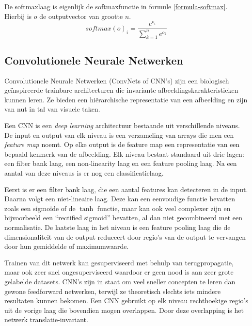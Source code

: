 De softmaxlaag is eigenlijk de softmaxfunctie in formule \ref{formula-softmax}. Hierbij is $o$ de outputvector van grootte $n$.
\begin{equation}
softmax(o)_i = \frac{e^{o_i}}{\sum^{n}_{k=1}{e^{o_k}}}
\label{formula-softmax}
\end{equation}


\subsection{Convolutionele Neurale Netwerken}
\label{sec:CNN}
Convolutionele Neurale Netwerken (ConvNets of CNN's) zijn een biologisch ge\" inspireerde trainbare architecturen die invariante afbeeldingskarakteristieken kunnen leren.\cite{LeCun2010} Ze bieden een hi\"erarchische representatie van een afbeelding en zijn van nut in tal van visuele taken.\cite{Girshick2014}\cite{Ciresan2012}\cite{Zhou2015}

Een CNN is een \emph{deep learning} architectuur bestaande uit verschillende niveaus. De input en output van elk niveau is een verzameling van arrays die men een \emph{feature map} noemt. Op elke output is de feature map een representatie van een bepaald kenmerk van de afbeelding. Elk niveau bestaat standaard uit drie lagen: een filter bank laag, een non-linearity laag en een feature pooling laag. Na een aantal van deze niveaus is er nog een classificatielaag.

Eerst is er een filter bank laag, die een aantal features kan detecteren in de input. Daarna volgt een niet-lineaire laag. Deze kan een eenvoudige functie bevatten zoals een sigmo\"ide of de $\tanh$ functie, maar kan ook veel complexer zijn en bijvoorbeeld een ``rectified sigmoid'' bevatten, al dan niet gecombineerd met een normalisatie.  De laatste laag in het niveau is een feature pooling laag die de dimensionaliteit van de output reduceert door regio's van de output te vervangen door hun gemiddelde of maximumwaarde.

Trainen van dit netwerk kan gesuperviseerd met behulp van terugpropagatie, maar ook zeer snel ongesuperviseerd waardoor er geen nood is aan zeer grote gelabelde datasets. CNN's zijn in staat om veel sneller concepten te leren dan gewone feedforward netwerken, terwijl ze theoretisch slechts iets mindere resultaten kunnen bekomen. Een CNN gebruikt op elk niveau rechthoekige regio's uit de vorige laag die bovendien mogen overlappen. Door deze overlapping is het netwerk translatie-invariant.

